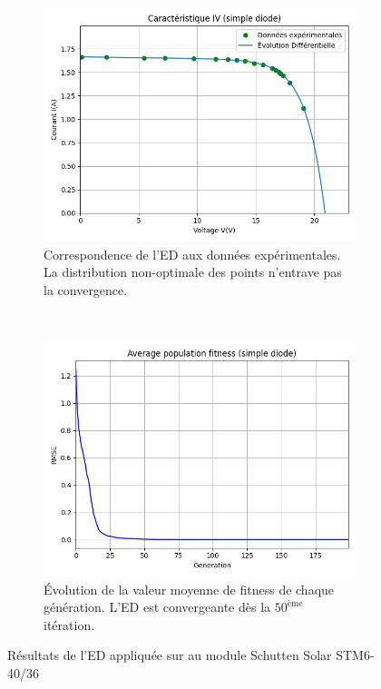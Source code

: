 \begin{figure}[t!]
    \centering
    \begin{subfigure}[b]{0.45\textwidth}
        \includegraphics[width=\textwidth]{resources/STM6/singled/iv.png}
        \caption{Correspondence de l'ED aux données expérimentales. La distribution non-optimale des points n'entrave pas la convergence.}
    \end{subfigure}
    ~
    \begin{subfigure}[b]{0.45\textwidth}
        \includegraphics[width=\textwidth]{resources/STM6/singled/fitness.png}
        \caption{Évolution de la valeur moyenne de fitness de chaque génération. L'ED est convergeante dès la $50^{\text{ème}}$ itération.}
    \end{subfigure}
    \caption{Résultats de l'ED appliquée sur au module Schutten Solar STM6-40/36}
    \label{fig:STM6res}
\end{figure}

